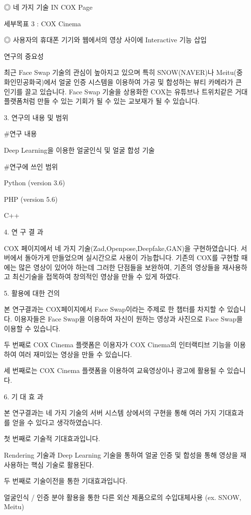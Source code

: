 \documentclass{oblivoir}
\begin{document}
◎ 네 가지 기술 IN COX Page

 세부목표 3 : COX Cinema 

◎ 사용자의 휴대폰 기기와 웹에서의 영상 사이에 Interactive 기능 삽입

 연구의 중요성

  최근 Face Swap 기술의 관심이 높아지고 있으며 특히 SNOW(NAVER)나 Meitu(중화인민공화국)에서 얼굴 인증 시스템을 이용하여 가공 및 합성하는 뷰티 카메라가 큰 인기를 끌고 있습니다. Face Swap 기술을 상용화한 COX는 유튜브나 트위치같은 거대 플랫폼처럼 만들 수 있는 기회가 될 수 있는 교보재가 될 수 있습니다.

 3. 연구의 내용 및 범위

#연구 내용

Deep Learning을 이용한 얼굴인식 및 얼굴 합성 기술

#연구에 쓰인 범위

Python (version 3.6) 

PHP (version 5.6) 

C++

4. 연  구  결  과

 COX 페이지에서 네 가지 기술(Zad,Openpose,Deepfake,GAN)을 구현하였습니다. 서버에서 돌아가게 만들었으며 실시간으로 사용이 가능합니다.
 기존의 COX를 구현할 때에는 많은 영상이 있어야 하는데 그러한 단점들을 보완하여, 기존의 영상들을 재사용하고 최신기술을 접목하여 창의적인 영상을 만들 수 있게 하였다.

5. 활용에 대한 건의

본 연구결과는 COX페이지에서 Face Swap이라는 주제로 한 챕터를 차지할 수 있습니다. 이용자들은 Face Swap을 이용하여 자신이 원하는 영상과 사진으로 Face Swap을 이용할 수 있습니다.

두 번째로 COX Cinema 플랫폼은 이용자가 COX Cinema의 인터랙티브 기능을 이용하여 여러 재미있는 영상을 만들 수 있습니다. 

세 번째로는 COX Cinema 플랫폼을 이용하여 교육영상이나 광고에 활용될 수 있습니다.

6. 기  대  효  과

본 연구결과는 네 가지 기술의 서버 시스템 상에서의 구현을 통해 여러 가지 기대효과를 얻을 수 있다고 생각하였습니다.

첫 번째로 기술적 기대효과입니다. 

Rendering 기술과 Deep Learning 기술을 통하여 얼굴 인증 및 합성을 통해 영상을 재사용하는 핵심 기술로 활용된다.


두 번째로 기술이전을 통한 기대효과입니다.

얼굴인식 / 인증 분야 활용을 통한 다른 외산 제품으로의 수입대체사용 (ex. SNOW, Meitu)
\end{document}

